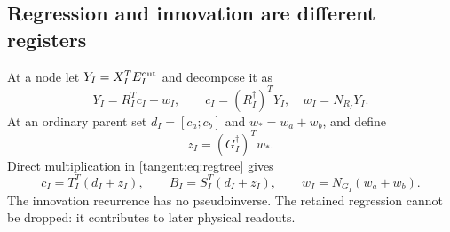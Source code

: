 \documentclass[11pt,oneside,openany,a4paper]{book}
\numberwithin{equation}{chapter}
\theoremstyle{definition}
\theoremstyle{remark}
\begin{document}
\subsection{Regression and innovation are different registers}
At a node let $Y_I=X_I^TE_I^{\rm out}$ and decompose it as
\[
 Y_I=R_I^Tc_I+w_I,\qquad
 c_I=(R_I^\dagger)^TY_I,\quad w_I=N_{R_I}Y_I.
\]
At an ordinary parent set $d_I=[c_a;c_b]$ and $w_*=w_a+w_b$, and define
\[
 z_I=(G_I^\dagger)^Tw_*.
\]
Direct multiplication in \eqref{tangent:eq:regtree} gives
\begin{equation}\label{tangent:eq:registers}
 \boxed{\quad
 c_I=T_I^T(d_I+z_I),\qquad
 B_I=S_I^T(d_I+z_I),\qquad
 w_I=N_{G_I}(w_a+w_b).
 \quad}
\end{equation}
The innovation recurrence has no pseudoinverse. The retained regression cannot be dropped: it contributes to later physical readouts.
\end{document}
